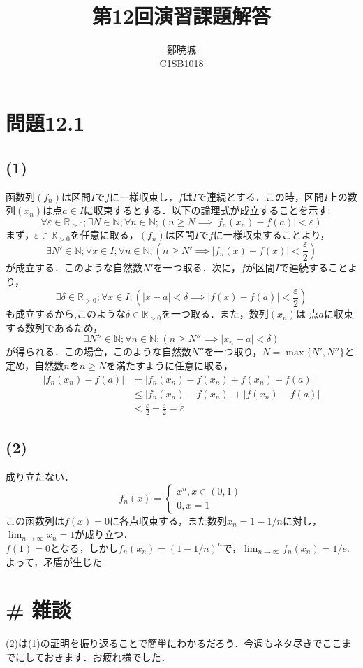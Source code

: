 \documentclass{jreport}
\newcommand{\Rp}{\mathbb{R}_{>0}}
\newcommand{\N}{\mathbb{N}}
\begin{document}
\title{第12回演習課題解答}
\author{鄒暁城\\ C1SB1018}
\maketitle
\newpage
\tableofcontents
\newpage
\setcounter{chapter}{12}
\section{問題12.1}
\subsection{(1)}
函数列$(f_n)$は区間$I$で$f$に一様収束し，$f$は$I$で連続とする．この時，区間$I$上の数列$(x_n)$は点$a \in I$に収束するとする．以下の論理式が成立することを示す:
$$
\forall \varepsilon \in \Rp; \exists N \in \N; \forall n \in \N;\left( n\ge N \implies \left|f_n(x_n)-f(a) \right| < \varepsilon \right)
$$
まず，$\varepsilon \in \Rp$を任意に取る，$(f_n)$は区間$I$で$f$に一様収束することより，
$$
\exists N' \in \N;\forall x \in I; \forall n \in \N;\left( n\ge N' \implies \left| f_n(x) - f(x) \right| <\frac{\varepsilon}{2} \right)
$$
が成立する．このような自然数$N'$を一つ取る．次に，$f$が区間$I$で連続することより，
$$
\exists \delta \in \Rp; \forall x \in I; \left( |x-a|<\delta \implies |f(x) -f(a)|<\frac{\varepsilon}{2} \right)
$$
も成立するから,このような$\delta \in \Rp$を一つ取る．また，数列$(x_n)$は 点$a $に収束する数列であるため，
$$
\exists N'' \in \N; \forall n \in \N; \left( n\ge N'' \implies |x_n - a|<\delta \right)
$$
が得られる．この場合，このような自然数$N''$を一つ取り，$N = \max\{ N',N''\}$と定め，自然数$n$を$n\ge N$を満たすように任意に取る，
\begin{equation}
\begin{aligned}
	|f_n(x_n) -f(a)|&=|f_n(x_n) - f(x_n) +f(x_n) -f(a) |\\
			& \le |f_n(x_n) -f(x_n)| + |f(x_n) - f(a)| \\
			&<\frac{\varepsilon}{2} +\frac{\varepsilon}{2} =\varepsilon
\end{aligned}
\end{equation}
\newpage
\subsection{(2)}
成り立たない．
$$
f_n(x)=\begin{cases}
	x^n , x\in (0,1)\\
	0,x=1
	\end{cases}
$$
この函数列は$f(x)=0$に各点収束する，また数列$x_n=1-1/n$に対し，$\lim_{n\to \infty}x_n =1$が成り立つ．\\
$f(1)=0$となる，しかし$f_n(x_n)=(1-1/n)^{n}$で，$\lim_{n\to\infty}f_n(x_n)=1/e$.よって，矛盾が生じた\\
\newpage
\section{\# 雑談}
(2)は(1)の証明を振り返ることで簡単にわかるだろう．今週もネタ尽きでここまでにしておきます．お疲れ様でした．
\end{document}
